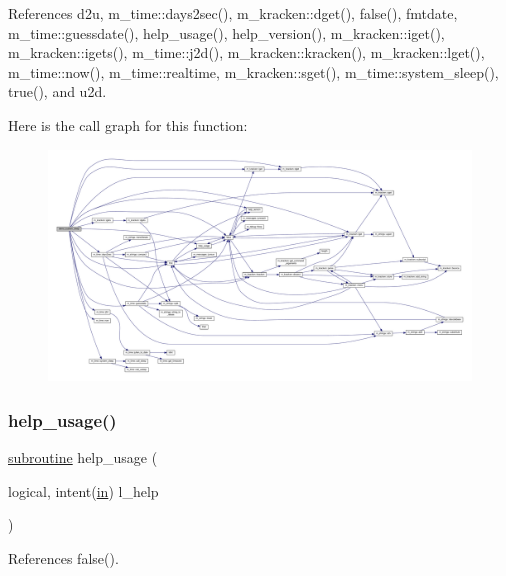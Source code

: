 References d2u, m\+\_\+time\+::days2sec(), m\+\_\+kracken\+::dget(), false(), fmtdate, m\+\_\+time\+::guessdate(), help\+\_\+usage(), help\+\_\+version(), m\+\_\+kracken\+::iget(), m\+\_\+kracken\+::igets(), m\+\_\+time\+::j2d(), m\+\_\+kracken\+::kracken(), m\+\_\+kracken\+::lget(), m\+\_\+time\+::now(), m\+\_\+time\+::realtime, m\+\_\+kracken\+::sget(), m\+\_\+time\+::system\+\_\+sleep(), true(), and u2d.

Here is the call graph for this function\+:
\nopagebreak
\begin{figure}[H]
\begin{center}
\leavevmode
\includegraphics[width=350pt]{paws_8f90_adea2b9826964203f987d029f48afa37a_cgraph}
\end{center}
\end{figure}
\mbox{\label{paws_8f90_a3e09a3b52ee8fb04eeb93fe5761626a8}} 
\subsubsection{\texorpdfstring{help\+\_\+usage()}{help\_usage()}}
{\footnotesize\ttfamily \hyperlink{M__stopwatch_83_8txt_acfbcff50169d691ff02d4a123ed70482}{subroutine} help\+\_\+usage (\begin{DoxyParamCaption}\item[{logical, intent(\hyperlink{M__journal_83_8txt_afce72651d1eed785a2132bee863b2f38}{in})}]{l\+\_\+help }\end{DoxyParamCaption})}



References false().

